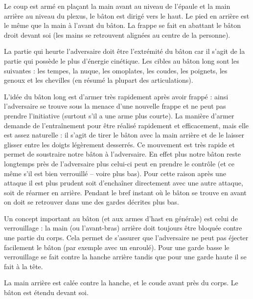\begin{coup}

Le coup est armé en plaçant la main avant au niveau de l'épaule et la main arrière au niveau du plexus, le bâton est dirigé vers le haut.
Le pied en arrière est le même que la main à l'avant du bâton.
La frappe se fait en abattant le bâton droit devant soi (les mains se retrouvent alignées au centre de la personne).
\end{coup}


La partie qui heurte l'adversaire doit être l'extrémité du bâton car il s'agit de la partie qui possède le plus d'énergie cinétique.
Les cibles au bâton long sont les suivantes : les tempes, la nuque, les omoplates, les coudes, les poignets, les genoux et les chevilles (en résumé la plupart des articulations).

L'idée du bâton long est d'armer très rapidement après avoir frappé : ainsi l'adversaire se trouve sous la menace d'une nouvelle frappe et ne peut pas prendre l'initiative (surtout s'il a une arme plus courte).
La manière d'armer demande de l'entraînement pour être réalisé rapidement et efficacement, mais elle est assez naturelle : il s'agit de tirer le bâton avec la main arrière et de le laisser glisser entre les doigts légèrement desserrés.
Ce mouvement est très rapide et permet de soustraire notre bâton à l'adversaire.
En effet plus notre bâton reste longtemps près de l'adversaire plus celui-ci peut en prendre le contrôle (et ce même s'il est bien verrouillé -- voire plus bas).
Pour cette raison après une attaque il est plus prudent soit d'enchaîner directement avec une autre attaque, soit de réarmer en arrière.
Pendant le bref instant où le bâton se trouve en avant on doit se retrouver dans une des gardes décrites plus bas.



Un concept important au bâton (et aux armes d'hast en générale) est celui de verrouillage : la main (ou l'avant-bras) arrière doit toujours être bloquée contre une partie du corps.
Cela permet de s'assurer que l'adversaire ne peut pas éjecter facilement le bâton (par exemple avec un enroulé).
Pour une garde basse le verrouillage se fait contre la hanche arrière tandis que pour une garde haute il se fait à la tête.


\begin{garde}

La main arrière est calée contre la hanche, et le coude avant près du corps.
Le bâton est étendu devant soi.
\end{garde}


